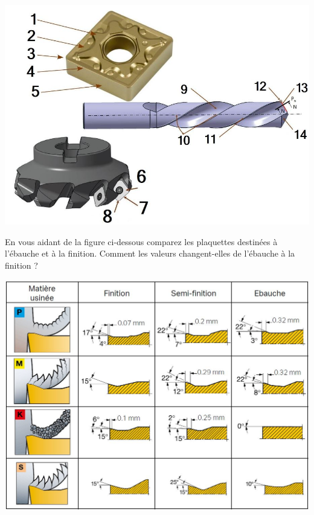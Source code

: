 \documentclass[12pt,a4paper]{article} %
\begin{document}
\includegraphics[scale=0.6]{PLA20.JPG}




\begin{exo} En vous aidant de la figure ci-dessous comparez les plaquettes destinées à l'ébauche et à la finition. Comment les valeurs changent-elles de l'ébauche à la finition ?\end{exo}

\includegraphics[scale=0.5]{PLA21.JPG}

\end{document}
